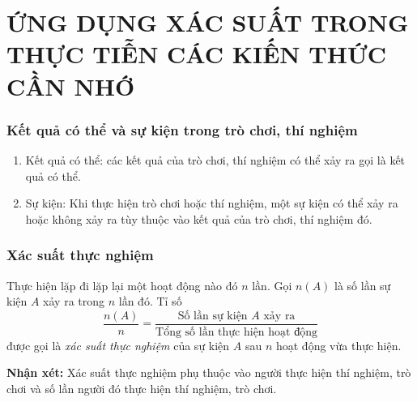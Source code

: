 \def\i{\item}
\graphicspath{{../pictures/c5/}}
\newpage
\section{ỨNG DỤNG XÁC SUẤT TRONG THỰC TIỄN CÁC KIẾN THỨC CẦN NHỚ}
\subsubsection{Kết quả có thể và sự kiện trong trò chơi, thí nghiệm}
\begin{enumerate}[--,leftmargin=*]
	\i Kết quả có thể: các kết quả của trò chơi, thí nghiệm có thể xảy ra gọi là kết quả có thể.
	\i Sự kiện: Khi thực hiện trò chơi hoặc thí nghiệm, một sự kiện có thể xảy ra hoặc không xảy ra tùy thuộc vào kết quả của trò chơi, thí nghiệm đó.
\end{enumerate}
\subsubsection{Xác suất thực nghiệm} 
Thực hiện lặp đi lặp lại một hoạt động nào đó $n$ lần. Gọi $n(A)$ là số lần sự kiện $A$ xảy ra trong $n$ lần đó. Tỉ số
\[\dfrac{n(A)}{n} = \dfrac{\text{Số lần sự kiện $A$ xảy ra}}{\text{Tổng số lần thực hiện hoạt động}}\] 
được gọi là \textit{xác suất thực nghiệm} của sự kiện $A$ sau $n$ hoạt động vừa thực hiện.

\textbf{Nhận xét:} Xác suất thực nghiệm phụ thuộc vào người thực hiện thí nghiệm, trò chơi và số lần người đó thực hiện thí nghiệm, trò chơi.

